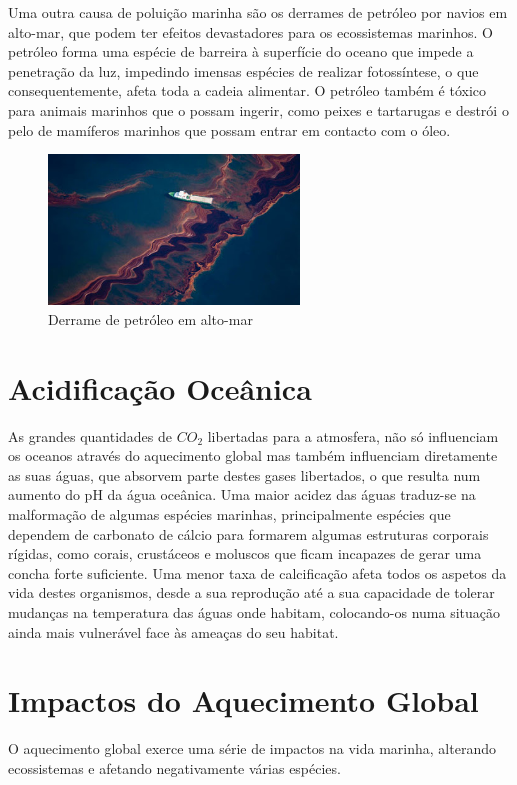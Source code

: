 \documentclass{report}
\begin{document}
Uma outra causa de poluição marinha são os derrames de petróleo por navios em alto-mar, que podem ter efeitos devastadores para os ecossistemas marinhos. O petróleo forma uma espécie de barreira à superfície do oceano que impede a penetração da luz, impedindo imensas espécies de realizar fotossíntese, o que consequentemente, afeta toda a cadeia alimentar. O petróleo também é tóxico para animais marinhos que o possam ingerir, como peixes e tartarugas e destrói o pelo de mamíferos marinhos que possam entrar em contacto com o óleo. 


\begin{figure}[H]
    \center
    \includegraphics[height=4cm]{imagens/oil-spill.jpg}
    \caption{Derrame de petróleo em alto-mar}
    \label{fig:Derrame_petroleo}
\end{figure}


\section{Acidificação Oceânica}
\label{acidificacao}
As grandes quantidades de $CO_{2}$ libertadas para a atmosfera, não só influenciam os oceanos através do aquecimento global mas também influenciam diretamente as suas águas, que absorvem parte destes gases libertados, o que resulta num aumento do pH da água oceânica. Uma maior acidez das águas traduz-se na malformação de algumas espécies marinhas, principalmente espécies que dependem de carbonato de cálcio para formarem algumas estruturas corporais rígidas, como corais, crustáceos e moluscos que ficam incapazes de gerar uma concha forte suficiente. Uma menor taxa de calcificação afeta todos os aspetos da vida destes organismos, desde a sua reprodução até a sua capacidade de tolerar mudanças na temperatura das águas onde habitam, colocando-os numa situação ainda mais vulnerável face às ameaças do seu habitat.

\section{Impactos do Aquecimento Global}
\label{impactos}
O aquecimento global exerce uma série de impactos na vida marinha, alterando ecossistemas e afetando negativamente várias espécies.
\end{document}
